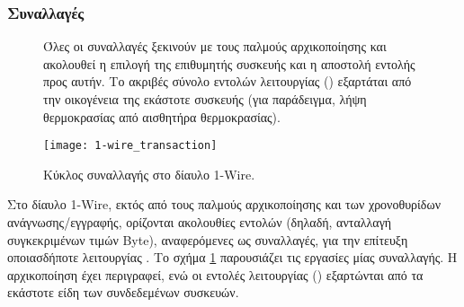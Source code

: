 \subsubsection{Συναλλαγές}

\begin{figure}
    \caption{Κύκλος συναλλαγής στο δίαυλο 1-Wire.
    \label{fig:1-wire:transaction}}
    Όλες οι συναλλαγές ξεκινούν με τους παλμούς αρχικοποίησης και ακολουθεί η
    επιλογή της επιθυμητής  συσκευής και η αποστολή εντολής προς
    αυτήν. Το ακριβές σύνολο εντολών λειτουργίας ()
    εξαρτάται από την οικογένεια της εκάστοτε συσκευής (για παράδειγμα, λήψη
    θερμοκρασίας από αισθητήρα θερμοκρασίας).
    \begin{center}
    \texttt{[image: 1-wire\_transaction]}
    \end{center}
\end{figure}

Στο δίαυλο 1-Wire, εκτός από τους παλμούς αρχικοποίησης και των χρονοθυρίδων
ανάγνωσης\slash{}εγγραφής, ορίζονται ακολουθίες εντολών (δηλαδή, ανταλλαγή
συγκεκριμένων τιμών Byte), αναφερόμενες ως συναλλαγές, για την επίτευξη
οποιασδήποτε λειτουργίας \parencite[10]{ds18b20}. Το σχήμα
\ref{fig:1-wire:transaction} παρουσιάζει τις εργασίες μίας συναλλαγής.
Η αρχικοποίηση έχει περιγραφεί, ενώ οι εντολές λειτουργίας
() εξαρτώνται από τα εκάστοτε είδη των συνδεδεμένων
συσκευών.

